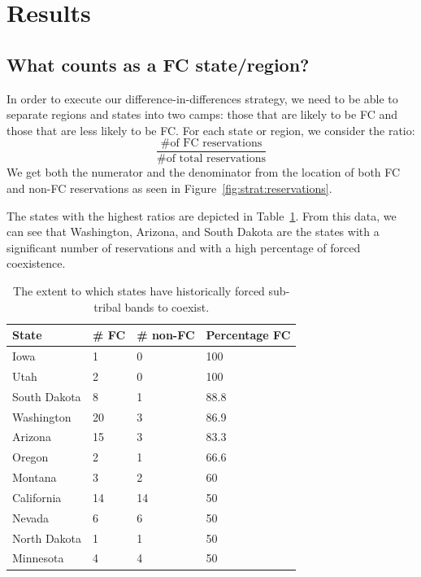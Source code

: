 \documentclass[12pt]{article}
\begin{document}
\section{Results}

\subsection{What counts as a FC state/region?}
In order to execute our difference-in-differences strategy, we need to be able to separate regions and states into two camps: those that are likely to be FC and those that are less likely to be FC. For each state or region, we consider the ratio:
$$\frac{\mbox{\# of FC reservations}}{\mbox{\# of total reservations}}$$
We get both the numerator and the denominator from the location of both FC and non-FC reservations as seen in Figure~\ref{fig:strat:reservations}.

The states with the highest ratios are depicted in Table~\ref{fcpercent}.  From this data, we can see that Washington, Arizona, and South Dakota are the states with a significant number of reservations and with a high percentage of forced coexistence.

\begin{table}[ht!]
    \centering
    \begin{tabular}{ | l | l | l | l | }\hline\hline
    State        & \# FC & \# non-FC & Percentage FC \\\hline
    Iowa         & 1     & 0         & 100           \\
    Utah         & 2     & 0         & 100           \\
    South Dakota & 8     & 1         & 88.8          \\
    Washington   & 20    & 3         & 86.9          \\
    Arizona      & 15    & 3         & 83.3          \\
    Oregon       & 2     & 1         & 66.6          \\
    Montana      & 3     & 2         & 60            \\
    California   & 14    & 14        & 50            \\
    Nevada       & 6     & 6         & 50            \\
    North Dakota & 1     & 1         & 50            \\
    Minnesota    & 4     & 4         & 50            \\\hline
    \end{tabular}
    \caption{The extent to which states have historically forced sub-tribal bands to coexist.}
    \label{fcpercent}
\end{table}
\end{document}
